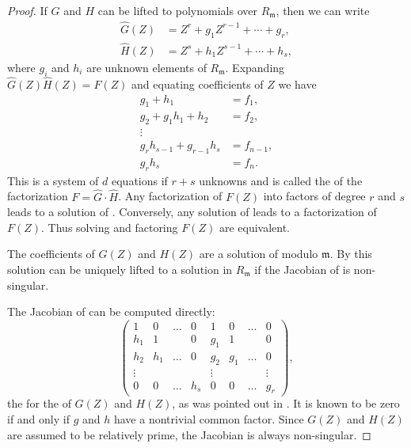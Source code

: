 {\begin{proof}
If $G$ and $H$ can be lifted to polynomials over
$R_\mathfrak{m}$, then we can write
\[
\begin{aligned}
\hat{G}(Z) & = Z^r + g_1 Z^{r-1} + \cdots + g_r, \\
\hat{H}(Z) & = Z^s + h_1 Z^{s-1} + \cdots + h_s, 
\end{aligned}
\]
where $g_i$ and $h_i$ are unknown elements of $R_\mathfrak{m}$.
Expanding $\hat{G}(Z) \hat{H}(Z) = F(Z)$ and equating coefficients of
$Z$ we have
\begin{equation}\label{Hensel:Eq}
\begin{aligned}
  g_1 + h_1&= f_1,\\
  g_2 + g_1h_1 + h_2&= f_2,\\
  \vdots&\\
  g_r h_{s-1} + g_{r-1} h_s&= f_{n-1},\\
  g_r h_s&= f_n.
\end{aligned}
\end{equation}
This is a system of $d$ equations if $r+s$ unknowns and is called the
 of the factorization $F = \hat{G}\cdot
\hat{H}$.  Any factorization of $F(Z)$ into factors of degree $r$ and
$s$ leads to a solution of .  Conversely, any
solution of  leads to a factorization of $F(Z)$.
Thus solving  and factoring $F(Z)$ are equivalent. 

The coefficients of $G(Z)$ and $H(Z)$ are a solution of
 modulo $\mathfrak{m}$.  By  this
solution can be uniquely lifted to a solution in $R_\mathfrak{m}$ if the
Jacobian of  is non-singular.

The Jacobian of  can be computed directly:
\[
\left(
\begin{array}{cccccccc}
  1 &   0 & \ldots &   0 &   1 &   0 & \ldots & 0 \\
h_1 &   1 &        &   0 & g_1 &   1 &        & 0 \\
h_2 & h_1 & \ldots &   0 & g_2 & g_1 & \ldots & 0 \\
\vdots&   &        &     & \vdots&   &        &\vdots\\
0   &   0 & \ldots & h_s & 0   &   0 & \ldots &g_r
\end{array}
\right),
\]
the  for the  of $G(Z)$ and
$H(Z)$, as was pointed out in .  It is
known to be zero if and only if $g$ and $h$ have a nontrivial common
factor.  Since $G(Z)$ and $H(Z)$ are assumed to be relatively prime,
the Jacobian is always non-singular.
\end{proof}

}
